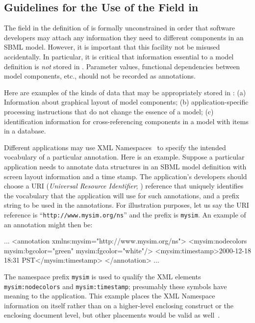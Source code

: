 \documentclass[10pt,twocolumntoc]{cekarticle}
\begin{document}
\subsection{Guidelines for the Use of the  Field in
  }

The  field in the definition of  is
formally unconstrained in order that software developers may attach any
information they need to different components in an SBML model. However,
it is important that this facility not be misused accidentally.  In
particular, it is critical that information essential to a model definition
is \emph{not} stored in .  Parameter values, functional
dependencies between model components, etc., should not be recorded as
annotations.

Here are examples of the kinds of data that may be appropriately
stored in : (a) Information about graphical
layout of model components; (b) application-specific processing
instructions that do not change the essence of a model; (c)
identification information for cross-referencing components in a
model with items in a database.

Different applications may use XML Namespaces~\citep{bray:1999} to specify
the intended vocabulary of a particular annotation.  Here is an example.
Suppose a particular application needs to annotate data structures in
an SBML model definition with screen layout information and a time stamp.
The application's developers should choose a URI (\emph{Universal Resource
  Identifier}; \citealt{harold:2001,w3c:2000}) reference that uniquely
identifies the vocabulary that the application will use for such
annotations, and a prefix string to be used in the annotations.  For
illustration purposes, let us say the URI reference is
``\texttt{http://www.mysim.org/ns}'' and the prefix is \texttt{mysim}.  An
example of an annotation might then be:

\begin{example}
...
<annotation xmlns:mysim="http://www.mysim.org/ns">
    <mysim:nodecolors mysim:bgcolor="green" mysim:fgcolor="white"/>
    <mysim:timestamp>2000-12-18 18:31 PST</mysim:timestamp>
</annotation>
...
\end{example}

The namespace prefix \texttt{mysim} is used to qualify the XML elements
\texttt{mysim:nodecolors} and \texttt{mysim:timestamp}; presumably these
symbols have meaning to the application.  This example places the XML
Namespace information on  itself rather than on a
higher-level enclosing construct or the enclosing document level, but other
placements would be valid as well~\citep{bray:1999}.
\end{document}
